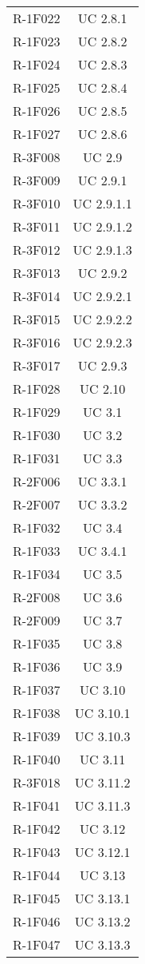 \begin{tabularx}{\textwidth}{c|c}
		R-1F022 & UC 2.8.1 \\
		R-1F023 & UC 2.8.2 \\
		R-1F024 & UC 2.8.3 \\
		R-1F025 & UC 2.8.4 \\
		R-1F026 & UC 2.8.5 \\
		R-1F027 & UC 2.8.6 \\
		R-3F008 & UC 2.9 \\
		R-3F009 & UC 2.9.1 \\
		R-3F010 & UC 2.9.1.1 \\
		R-3F011 & UC 2.9.1.2 \\
		R-3F012 & UC 2.9.1.3 \\
		R-3F013 & UC 2.9.2 \\
		R-3F014 & UC 2.9.2.1 \\
		R-3F015 & UC 2.9.2.2 \\
		R-3F016 & UC 2.9.2.3 \\
		R-3F017 & UC 2.9.3 \\
		R-1F028 & UC 2.10 \\
		R-1F029 & UC 3.1 \\
		R-1F030 & UC 3.2 \\
		R-1F031 & UC 3.3 \\
		R-2F006 & UC 3.3.1 \\
		R-2F007 & UC 3.3.2 \\
		R-1F032 & UC 3.4 \\
		R-1F033 & UC 3.4.1 \\
		R-1F034 & UC 3.5 \\
		R-2F008 & UC 3.6 \\
		R-2F009 & UC 3.7 \\
		R-1F035 & UC 3.8 \\
		R-1F036 & UC 3.9 \\
		R-1F037 & UC 3.10 \\
		R-1F038 & UC 3.10.1 \\
		R-1F039 & UC 3.10.3 \\
		R-1F040 & UC 3.11 \\
		R-3F018 & UC 3.11.2 \\
		R-1F041 & UC 3.11.3 \\
		R-1F042 & UC 3.12 \\
		R-1F043 & UC 3.12.1 \\
		R-1F044 & UC 3.13 \\
		R-1F045 & UC 3.13.1 \\
		R-1F046 & UC 3.13.2 \\
		R-1F047 & UC 3.13.3 \\

\end{tabularx}
